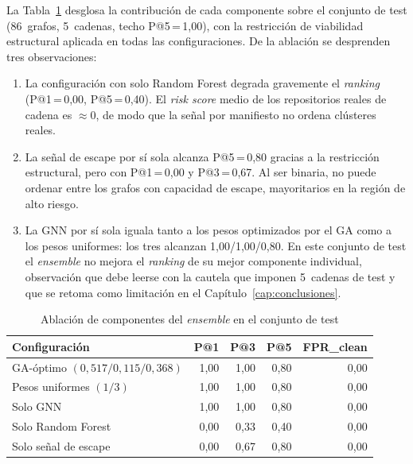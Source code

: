 La Tabla~\ref{tab:ensemble_ablation} desglosa la contribución de cada componente
sobre el conjunto de test (86~grafos, 5~cadenas, techo P@5\,=\,1,00), con la
restricción de viabilidad estructural aplicada
en todas las configuraciones. De la ablación se desprenden tres observaciones:

\begin{enumerate}
  \item La configuración con solo Random Forest degrada gravemente el
    \textit{ranking} (P@1\,=\,0,00, P@5\,=\,0,40). El \textit{risk score} medio de
    los repositorios reales de cadena es \(\approx\)0, de modo que la señal por
    manifiesto no ordena clústeres reales.

  \item La señal de escape por sí sola alcanza P@5\,=\,0,80 gracias a la
    restricción estructural, pero con P@1\,=\,0,00 y P@3\,=\,0,67. Al ser binaria,
    no puede ordenar entre los grafos con capacidad de escape, mayoritarios en la
    región de alto riesgo.

  \item La \ac{GNN} por sí sola iguala tanto a los pesos optimizados por el
    \ac{GA} como a los pesos uniformes: los tres alcanzan 1,00/1,00/0,80. En este
    conjunto de test el \textit{ensemble} no mejora el \textit{ranking} de su
    mejor componente individual, observación que debe leerse con la cautela que
    imponen 5~cadenas de test y que se retoma como limitación en el
    Capítulo~\ref{cap:conclusiones}.
\end{enumerate}

\begin{table}[htbp]
\centering
\caption{Ablación de componentes del \textit{ensemble} en el conjunto de test}
\label{tab:ensemble_ablation}
\begin{tabular}{@{}lrrrr@{}}
\toprule
Configuración & P@1 & P@3 & P@5 & FPR\_clean \\
\midrule
GA-óptimo \((0{,}517/0{,}115/0{,}368)\) & 1,00 & 1,00 & 0,80 & 0,00 \\
Pesos uniformes \((1/3)\)               & 1,00 & 1,00 & 0,80 & 0,00 \\
Solo \ac{GNN}                           & 1,00 & 1,00 & 0,80 & 0,00 \\
Solo Random Forest                            & 0,00 & 0,33 & 0,40 & 0,00 \\
Solo señal de escape                    & 0,00 & 0,67 & 0,80 & 0,00 \\
\bottomrule
\end{tabular}
\fuentepropia
\end{table}

